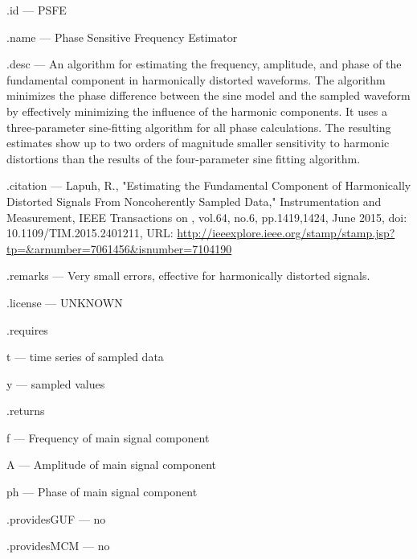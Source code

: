 \begin{tightdesc}
\item [\textsf{.id}] --- PSFE
\item [\textsf{.name}] --- Phase Sensitive Frequency Estimator
\item [\textsf{.desc}] --- An algorithm for estimating the frequency, amplitude, and phase of the fundamental component in harmonically distorted waveforms. The algorithm minimizes the phase difference between the sine model and the sampled waveform by effectively minimizing the influence of the harmonic components. It uses a three-parameter sine-fitting algorithm for all phase calculations. The resulting estimates show up to two orders of magnitude smaller sensitivity to harmonic distortions than the results of the four-parameter sine fitting algorithm.
\item [\textsf{.citation}] --- Lapuh, R., "Estimating the Fundamental Component of Harmonically Distorted Signals From Noncoherently Sampled Data," Instrumentation and Measurement, IEEE Transactions on , vol.64, no.6, pp.1419,1424, June 2015, doi: 10.1109/TIM.2015.2401211, URL: \url{http://ieeexplore.ieee.org/stamp/stamp.jsp?tp=\&arnumber=7061456\&isnumber=7104190}
\item [\textsf{.remarks}] --- Very small errors, effective for harmonically distorted signals.
\item [\textsf{.license}] --- UNKNOWN
\item [\textsf{.requires}] \rule{0em}{0em}
\begin{tightdesc}
\item [\textsf{t}] --- time series of sampled data
\item [\textsf{y}] --- sampled values
\end{tightdesc}
\item [\textsf{.returns}] \rule{0em}{0em}
\begin{tightdesc}
\item [\textsf{f}] --- Frequency of main signal component
\item [\textsf{A}] --- Amplitude of main signal component
\item [\textsf{ph}] --- Phase of main signal component
\end{tightdesc}
\item [\textsf{.providesGUF}] --- no
\item [\textsf{.providesMCM}] ---  no
\end{tightdesc}
